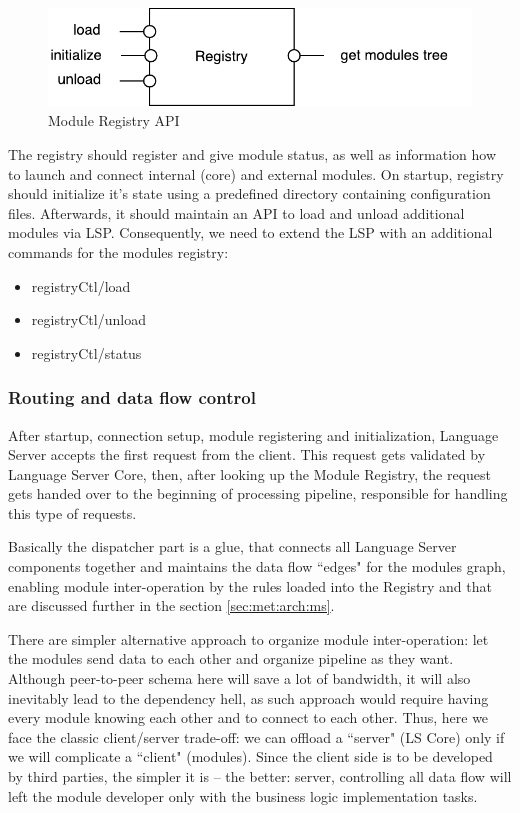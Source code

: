 \begin{figure}[H]
    \centering
    \includegraphics[width=.7\textwidth]{figs/registry.pdf}
    \caption{Module Registry API}
\end{figure}

\newpage
The registry should register and give module status, as well as information how to launch and connect
internal (core) and external modules. On startup, registry should initialize it's state using a predefined directory
containing configuration files. Afterwards, it should maintain an API to load and unload additional modules via LSP.
Consequently, we need to extend the LSP with an additional commands for the modules registry:

\begin{itemize}
    \item registryCtl/load
    \item registryCtl/unload
    \item registryCtl/status
\end{itemize}

\subsubsection{Routing and data flow control}
\label{sec:met:arch:core:dispatcher}

After startup, connection setup, module registering and initialization, 
Language Server accepts the first request from the client. 
This request gets validated by Language Server Core, then, after looking up the Module Registry, the request 
gets handed over to the beginning of processing pipeline, responsible for handling this type of requests.

Basically the dispatcher part is a glue, that connects all Language Server components together and 
maintains the data flow ``edges" for the modules graph, enabling module inter-operation by the
rules loaded into the Registry and that are discussed further in the section \ref{sec:met:arch:ms}.

There are simpler alternative approach to organize module inter-operation: let the modules send data 
to each other and organize pipeline as they want. Although peer-to-peer schema here will save a lot of bandwidth, 
it will also inevitably lead to the dependency hell, 
as such approach would require having every module knowing each other and to connect to each other. 
Thus, here we face the classic client/server trade-off: we can offload a ``server" (LS Core) only
if we will complicate a ``client" (modules). 
Since the client side is to be developed by third parties, the simpler it is -- the better: 
server, controlling all data flow will left the module developer only with the business logic implementation tasks. 

